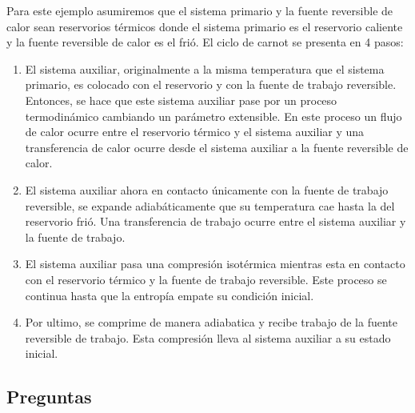 \documentclass{report}
\begin{document}
Para este ejemplo asumiremos que el sistema primario y la fuente reversible de calor sean reservorios térmicos donde el sistema primario es el reservorio caliente y la fuente reversible de calor es el frió. El ciclo de carnot se presenta en 4 pasos:
\begin{enumerate}
  \item El sistema auxiliar, originalmente a la misma temperatura que el sistema primario, es colocado con el reservorio y con la fuente de trabajo reversible. Entonces, se hace que este sistema auxiliar pase por un proceso termodinámico cambiando un parámetro extensible. En este proceso un flujo de calor ocurre entre el reservorio térmico y el sistema auxiliar y una transferencia de calor ocurre desde el sistema auxiliar a la fuente reversible de calor.

  \item El sistema auxiliar ahora en contacto únicamente con la fuente de trabajo reversible, se expande adiabáticamente que su temperatura cae hasta la del reservorio frió. Una transferencia de trabajo ocurre entre el sistema auxiliar y la fuente de trabajo.

  \item El sistema auxiliar pasa una compresión isotérmica mientras esta en contacto con el reservorio térmico y la fuente de trabajo reversible. Este proceso se continua hasta que la entropía empate su condición inicial.

  \item Por ultimo, se comprime de manera adiabatica y recibe trabajo de la fuente reversible de trabajo. Esta compresión lleva al sistema auxiliar a su estado inicial.
\end{enumerate}

\subsection{Preguntas}

\sol
\end{document}

